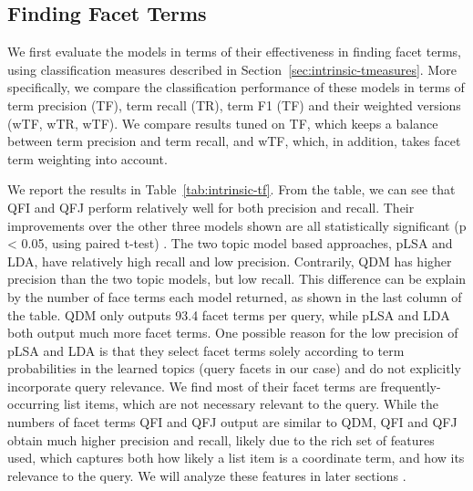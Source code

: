 \subsection{Finding Facet Terms}
\label{sec:expt}
We first evaluate the models in terms of their effectiveness in finding facet terms, using classification measures described in Section~\ref{sec:intrinsic-tmeasures}. More specifically, we compare the classification performance of these models in terms of term precision (TF), term recall (TR), term F1 (TF) and their weighted versions (wTF, wTR, wTF). We compare results tuned on TF, which keeps a balance between term precision and term recall, and wTF, which, in addition, takes facet term weighting into account.


We report the results in Table~\ref{tab:intrinsic-tf}. From the table, we can see that QFI and QFJ perform relatively well for both precision and recall. Their improvements over the other three models shown are all statistically significant (p < 0.05, using paired t-test) . The two topic model based approaches, pLSA and LDA, have relatively high recall and low precision. Contrarily, QDM has higher precision than the two topic models, but low recall.
This difference can be explain by the number of face terms each model returned, as shown in the last column of the table. QDM only outputs 93.4 facet terms per query, while pLSA and LDA both output much more facet terms. One possible reason for the low precision of pLSA and LDA is that they select facet terms solely according to term probabilities in the learned topics (query facets in our case) and do not explicitly incorporate query relevance. We find most of their facet terms are frequently-occurring list items, which are not necessary relevant to the query.
While the numbers of facet terms QFI and QFJ output are similar to QDM, QFI and QFJ obtain much higher precision and recall, likely due to the rich set of features used, which captures both how likely a list item is a coordinate term, and how its relevance to the query. We will analyze these features in later sections . 

